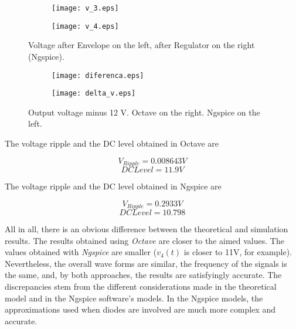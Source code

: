 \begin{figure}[ht]
    \centering
    \begin{subfigure}{.45\textwidth}
        \centering
        \texttt{[image: v\_3.eps]}
    \end{subfigure}
    \begin{subfigure}{.45\textwidth}
        \centering
        \texttt{[image: v\_4.eps]}
    \end{subfigure}
    \caption{Voltage after Envelope on the left, after Regulator on the right (Ngspice).}
\end{figure}

\begin{figure}[ht]
    \centering
    \begin{subfigure}{.45\textwidth}
        \centering
        \texttt{[image: diferenca.eps]}
    \end{subfigure}
    \begin{subfigure}{.45\textwidth}
        \centering
        \texttt{[image: delta\_v.eps]}
    \end{subfigure}
    \caption{Output voltage minus 12 V. Octave on the right. Ngspice on the left.}
\end{figure}

The voltage ripple and the DC level obtained in Octave are

\begin{equation}
    V_{Ripple} = 0.008643 V
\end{equation}
\begin{equation}
    DC Level = 11.9 V
\end{equation}

The voltage ripple and the DC level obtained in Ngspice are

\begin{equation}
    V_{Ripple} = 0.2933 V
\end{equation}
\begin{equation}
    DC Level = 10.798
\end{equation}

All in all, there is an obvious difference between the theoretical and simulation results. The results obtained using \textit{Octave} are closer to the aimed values. The values obtained with \textit{Ngspice} are smaller ($v_4(t)$ is closer to 11V, for example). Nevertheless, the overall wave forms are similar, the frequency of the signals is the same, and, by both approaches, the results are satisfyingly accurate. 
The discrepancies stem from the different considerations made in the theoretical model and in the Ngspice software's models. In the Ngspice models, the approximations used when diodes are involved are much more complex and accurate.
